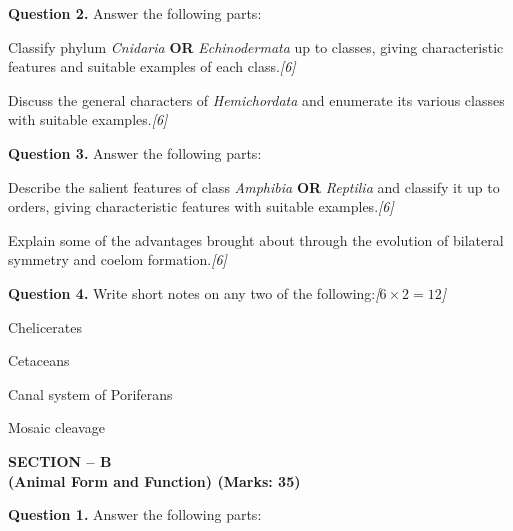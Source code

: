 \documentclass[11pt,a4paper]{article}
\newcommand{\pts}[1]{\hfill   \textit{[#1]}}
\begin{document}
\medskip


\noindent   \textbf{Question 2.} Answer the following parts:

\begin{parts}
  \item Classify phylum   \textit{Cnidaria}   \textbf{OR}   \textit{Echinodermata} up to classes, giving characteristic features and suitable examples of each class.\pts{6}
  \item Discuss the general characters of   \textit{Hemichordata} and enumerate its various classes with suitable examples.\pts{6}
\end{parts}

\medskip


\noindent   \textbf{Question 3.} Answer the following parts:

\begin{parts}
  \item Describe the salient features of class   \textit{Amphibia}   \textbf{OR}   \textit{Reptilia} and classify it up to orders, giving characteristic features with suitable examples.\pts{6}
  \item Explain some of the advantages brought about through the evolution of bilateral symmetry and coelom formation.\pts{6}
\end{parts}

\medskip


\noindent   \textbf{Question 4.} Write short notes on any two of the following:\pts{$6  \times 2 = 12$}

\begin{parts}
  \item Chelicerates
  \item Cetaceans
  \item Canal system of Poriferans
  \item Mosaic cleavage
\end{parts}

\pagebreak

\begin{center}
   \textbf{SECTION -- B} \\
   \textbf{(Animal Form and Function) (Marks: 35)}
\end{center}

\medskip


\noindent   \textbf{Question 1.} Answer the following parts:
\end{document}

